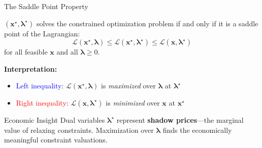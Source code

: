 \documentclass[aspectratio=1610]{beamer}
\begin{document}
\begin{frame}{The Saddle Point Property}
  \begin{theorem}
    $(\mathbf{x}^{\star}, \boldsymbol{\lambda}^{\star})$ solves the constrained optimization problem if and only if it is a saddle point of the Lagrangian:
    $$\mathcal{L}(\mathbf{x}^{\star}, \boldsymbol{\lambda}) \leq \mathcal{L}(\mathbf{x}^{\star}, \boldsymbol{\lambda}^{\star}) \leq \mathcal{L}(\mathbf{x}, \boldsymbol{\lambda}^{\star})$$
    for all feasible $\mathbf{x}$ and all $\boldsymbol{\lambda} \geq 0$.
  \end{theorem}
  
  \vspace{0.3cm}
  \textbf{Interpretation:}
  \begin{itemize}
    \item \textcolor{blue}{Left inequality}: $\mathcal{L}(\mathbf{x}^{\star}, \boldsymbol{\lambda})$ is \emph{maximized} over $\boldsymbol{\lambda}$ at $\boldsymbol{\lambda}^{\star}$
    \item \textcolor{red}{Right inequality}: $\mathcal{L}(\mathbf{x}, \boldsymbol{\lambda}^{\star})$ is \emph{minimized} over $\mathbf{x}$ at $\mathbf{x}^{\star}$
  \end{itemize}
  
  \vspace{0.3cm}
  \begin{block}{Economic Insight}
    Dual variables $\boldsymbol{\lambda}^{\star}$ represent \textbf{shadow prices}---the marginal value of relaxing constraints. Maximization over $\boldsymbol{\lambda}$ finds the economically meaningful constraint valuations.
  \end{block}
\end{frame}
\end{document}
